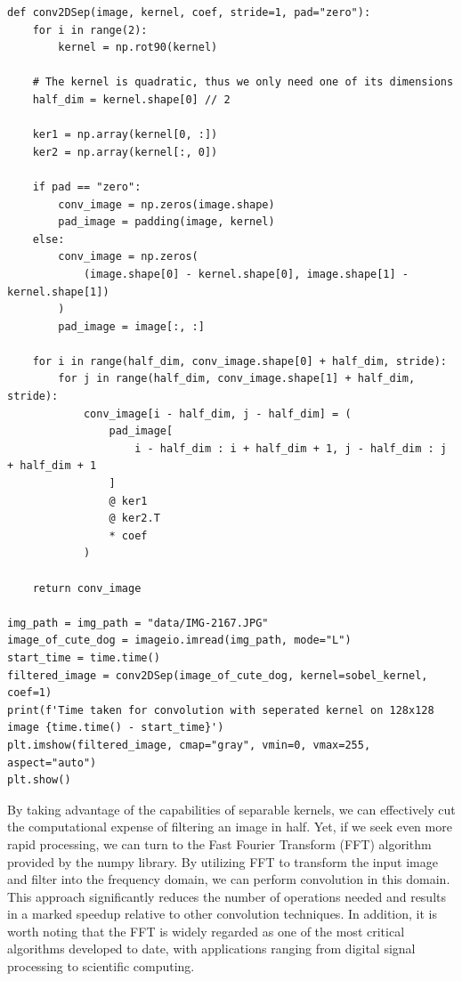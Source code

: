 \documentclass[%
oneside,                 %
final,                   %
10pt]{article}
\begin{document}
\begin{verbatim}
def conv2DSep(image, kernel, coef, stride=1, pad="zero"):
    for i in range(2):
        kernel = np.rot90(kernel)

    # The kernel is quadratic, thus we only need one of its dimensions
    half_dim = kernel.shape[0] // 2

    ker1 = np.array(kernel[0, :])
    ker2 = np.array(kernel[:, 0])

    if pad == "zero":
        conv_image = np.zeros(image.shape)
        pad_image = padding(image, kernel)
    else:
        conv_image = np.zeros(
            (image.shape[0] - kernel.shape[0], image.shape[1] - kernel.shape[1])
        )
        pad_image = image[:, :]

    for i in range(half_dim, conv_image.shape[0] + half_dim, stride):
        for j in range(half_dim, conv_image.shape[1] + half_dim, stride):
            conv_image[i - half_dim, j - half_dim] = (
                pad_image[
                    i - half_dim : i + half_dim + 1, j - half_dim : j + half_dim + 1
                ]
                @ ker1
                @ ker2.T
                * coef
            )

    return conv_image

img_path = img_path = "data/IMG-2167.JPG"
image_of_cute_dog = imageio.imread(img_path, mode="L")
start_time = time.time()
filtered_image = conv2DSep(image_of_cute_dog, kernel=sobel_kernel, coef=1)
print(f'Time taken for convolution with seperated kernel on 128x128 image {time.time() - start_time}')
plt.imshow(filtered_image, cmap="gray", vmin=0, vmax=255, aspect="auto")
plt.show()

\end{verbatim}


By taking advantage of the capabilities of separable kernels, we can
effectively cut the computational expense of filtering an image in
half. Yet, if we seek even more rapid processing, we can turn to the
Fast Fourier Transform (FFT) algorithm provided by the numpy
library. By utilizing FFT to transform the input image and filter into
the frequency domain, we can perform convolution in this domain. This
approach significantly reduces the number of operations needed and
results in a marked speedup relative to other convolution
techniques. In addition, it is worth noting that the FFT is widely
regarded as one of the most critical algorithms developed to date,
with applications ranging from digital signal processing to scientific
computing.
\end{document}
